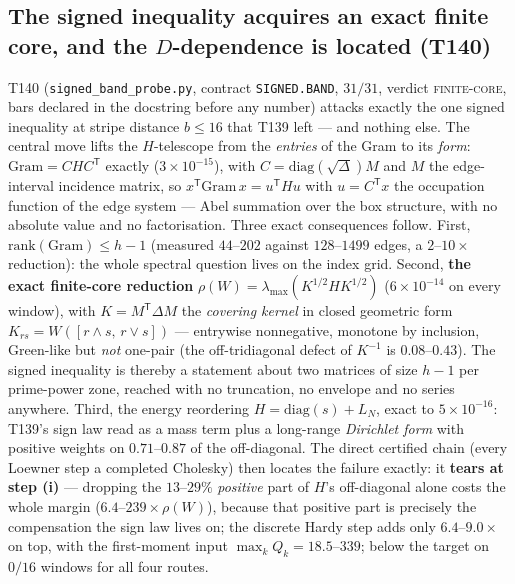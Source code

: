 \documentclass[11pt,a4paper]{article}
\begin{document}
\subsection{The signed inequality acquires an exact finite core, and the $D$-dependence is located (T140)}
T140 (\texttt{signed\_band\_probe.py}, contract \texttt{SIGNED.BAND}, $31/31$, verdict
\textsc{finite-core}, bars declared in the docstring before any number) attacks exactly the one
signed inequality at stripe distance $b\le16$ that T139 left --- and nothing else. The central move
lifts the $H$-telescope from the \emph{entries} of the Gram to its \emph{form}:
$\mathrm{Gram}=CHC^{\mathsf T}$ exactly ($3\times10^{-15}$), with $C=\mathrm{diag}(\sqrt\Delta)M$
and $M$ the edge-interval incidence matrix, so
$x^{\mathsf T}\mathrm{Gram}\,x=u^{\mathsf T}Hu$ with $u=C^{\mathsf T}x$ the occupation function of
the edge system --- Abel summation over the box structure, with no absolute value and no
factorisation. Three exact consequences follow. First, $\mathrm{rank}(\mathrm{Gram})\le h-1$
(measured $44$--$202$ against $128$--$1499$ edges, a $2$--$10\times$ reduction): the whole spectral
question lives on the index grid. Second, \textbf{the exact finite-core reduction}
$\rho(W)=\lambda_{\max}(K^{1/2}HK^{1/2})$ ($6\times10^{-14}$ on every window), with
$K=M^{\mathsf T}\Delta M$ the \emph{covering kernel} in closed geometric form
$K_{rs}=W([r\wedge s,\,r\vee s])$ --- entrywise nonnegative, monotone by inclusion, Green-like but
\emph{not} one-pair (the off-tridiagonal defect of $K^{-1}$ is $0.08$--$0.43$). The signed
inequality is thereby a statement about two matrices of size $h-1$ per prime-power zone, reached
with no truncation, no envelope and no series anywhere. Third, the energy reordering
$H=\mathrm{diag}(s)+L_N$, exact to $5\times10^{-16}$: T139's sign law read as a mass term plus a
long-range \emph{Dirichlet form} with positive weights on $0.71$--$0.87$ of the off-diagonal. The
direct certified chain (every Loewner step a completed Cholesky) then locates the failure exactly:
it \textbf{tears at step (i)} --- dropping the $13$--$29\%$ \emph{positive} part of $H$'s
off-diagonal alone costs the whole margin ($6.4$--$239\times\rho(W)$), because that positive part
is precisely the compensation the sign law lives on; the discrete Hardy step adds only
$6.4$--$9.0\times$ on top, with the first-moment input $\max_kQ_k=18.5$--$339$; below the target on
$0/16$ windows for all four routes.
\end{document}
